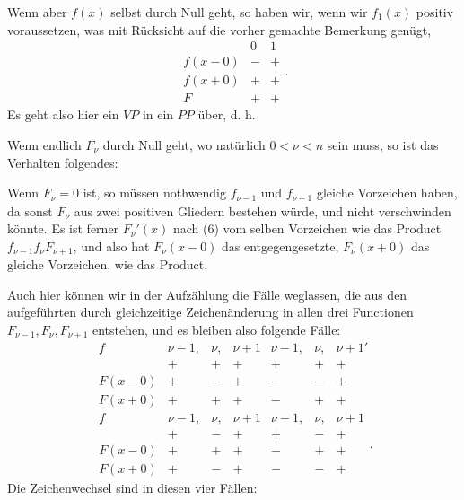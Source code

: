 

Wenn aber $f(x)$ selbst durch Null geht, so haben wir, wenn wir $f_1(x)$ positiv voraussetzen, was mit Rücksicht auf die vorher gemachte Bemerkung genügt,
\[
\begin{array}{c|cc}
 & 0 & 1 \\ \hline
f(x-0) & - & + \\
f(x+0) & + & + \\ \hline
F & + & +
\end{array}
\text{.}
\]
Es geht also hier ein $VP$ in ein $PP$ über, d. h. 

Wenn endlich $F_\nu$ durch Null geht, wo natürlich $0 < \nu < n$ sein muss, so ist das Verhalten folgendes:

Wenn $F_\nu = 0$ ist, so müssen nothwendig $f_{\nu-1}$ und $f_{\nu+1}$ gleiche Vorzeichen haben, da sonst $F_\nu$ aus zwei positiven Gliedern bestehen würde, und nicht verschwinden könnte. Es ist ferner $F_\nu'(x)$ nach (6) vom selben Vorzeichen wie das Product $f_{\nu-1} f_\nu F_{\nu+1}$, und also hat $F_\nu(x-0)$ das entgegengesetzte, $F_\nu(x+0)$ das gleiche Vorzeichen, wie das Product.

Auch hier können wir in der Aufzählung die Fälle weglassen, die aus den aufgeführten durch gleichzeitige Zeichenänderung in allen drei Functionen $F_{\nu-1}, F_\nu, F_{\nu+1}$ entstehen, und es bleiben also folgende Fälle:
\[
\begin{array}{c|ccc||ccc}
f & \nu-1, & \nu, & \nu+1 & \nu-1, & \nu, & \nu+1' \\
 & + & + & + & + & + & + \\ \hline
F(x-0) & + & - & + & - & - & + \\ \hline
F(x+0) & + & + & + & - & + & +
\end{array}
\]
\[
\begin{array}{c|ccc||ccc}
f & \nu-1, & \nu, & \nu+1 & \nu-1, & \nu, & \nu+1 \\
 & + & - & + & + & - & + \\ \hline
F(x-0) & + & + & + & - & + & + \\ \hline
F(x+0) & + & - & + & - & - & +
\end{array}
\text{.}
\]
Die Zeichenwechsel sind in diesen vier Fällen:

